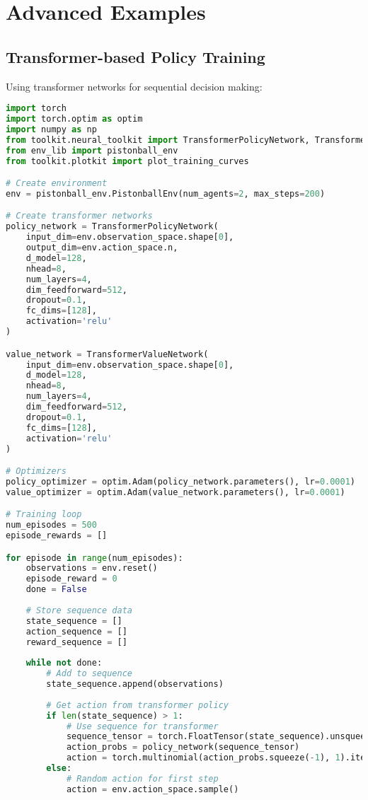 \section{Advanced Examples}

\subsection{Transformer-based Policy Training}

Using transformer networks for sequential decision making:

\begin{lstlisting}[language=python, caption=Transformer Policy Training]
import torch
import torch.optim as optim
import numpy as np
from toolkit.neural_toolkit import TransformerPolicyNetwork, TransformerValueNetwork
from env_lib import pistonball_env
from toolkit.plotkit import plot_training_curves

# Create environment
env = pistonball_env.PistonballEnv(num_agents=2, max_steps=200)

# Create transformer networks
policy_network = TransformerPolicyNetwork(
    input_dim=env.observation_space.shape[0],
    output_dim=env.action_space.n,
    d_model=128,
    nhead=8,
    num_layers=4,
    dim_feedforward=512,
    dropout=0.1,
    fc_dims=[128],
    activation='relu'
)

value_network = TransformerValueNetwork(
    input_dim=env.observation_space.shape[0],
    d_model=128,
    nhead=8,
    num_layers=4,
    dim_feedforward=512,
    dropout=0.1,
    fc_dims=[128],
    activation='relu'
)

# Optimizers
policy_optimizer = optim.Adam(policy_network.parameters(), lr=0.0001)
value_optimizer = optim.Adam(value_network.parameters(), lr=0.0001)

# Training loop
num_episodes = 500
episode_rewards = []

for episode in range(num_episodes):
    observations = env.reset()
    episode_reward = 0
    done = False
    
    # Store sequence data
    state_sequence = []
    action_sequence = []
    reward_sequence = []
    
    while not done:
        # Add to sequence
        state_sequence.append(observations)
        
        # Get action from transformer policy
        if len(state_sequence) > 1:
            # Use sequence for transformer
            sequence_tensor = torch.FloatTensor(state_sequence).unsqueeze(0)
            action_probs = policy_network(sequence_tensor)
            action = torch.multinomial(action_probs.squeeze(-1), 1).item()
        else:
            # Random action for first step
            action = env.action_space.sample()
        

\end{lstlisting}
